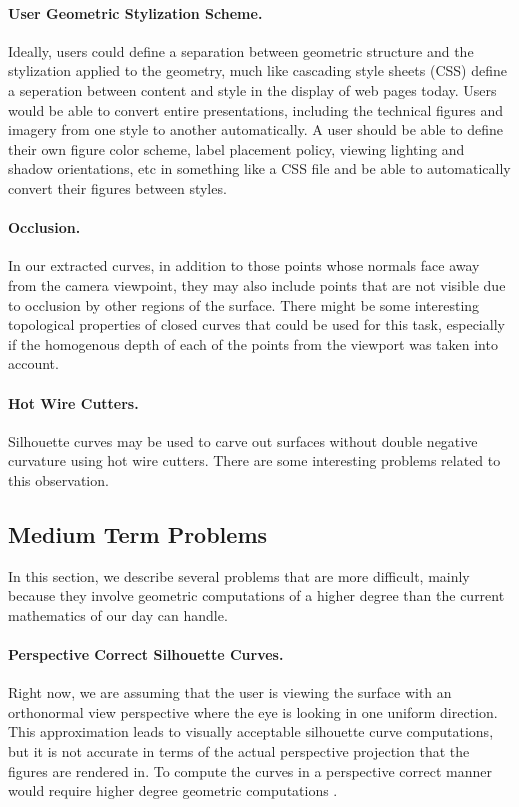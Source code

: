 \documentclass[12pt, letterpaper]{article}
\begin{document}
		\paragraph{User Geometric Stylization Scheme.}
		Ideally, users could define a separation between geometric structure and the stylization applied to the geometry, much like cascading style sheets (CSS)
		define a seperation between content and style in the display of web pages today. 
		Users would be able to convert entire presentations, including the technical figures and imagery from one style to another automatically.
		A user should be able to define their own figure color scheme, label placement policy, viewing lighting and shadow orientations, etc in something like a CSS file and be able to automatically convert their figures between styles.

		\paragraph{Occlusion.}

		In our extracted curves, in addition to those points whose normals face away from the camera viewpoint,
		they may also include points that are not visible due to occlusion by other regions of the surface.
		There might be some interesting topological properties of closed curves that could be used for this task,
		especially if the homogenous depth of each of the points from the viewport was taken into account.
		
		\paragraph{Hot Wire Cutters.}

		Silhouette curves may be used to carve out surfaces without double negative curvature using hot wire cutters.
		There are some interesting problems related to this observation.

	\subsection{Medium Term Problems}

		In this section, we describe several problems that are more difficult,
		mainly because they involve geometric computations of a higher degree than the current mathematics of our day can handle.
		
		\paragraph{Perspective Correct Silhouette Curves.}
		Right now, we are assuming that the user is viewing the surface with an orthonormal view perspective where the eye is looking in one uniform direction.
		This approximation leads to visually acceptable silhouette curve computations, but it is not accurate in terms of the actual perspective projection that the figures are rendered in.
		To compute the curves in a perspective correct manner would require higher degree geometric computations .
\end{document}
